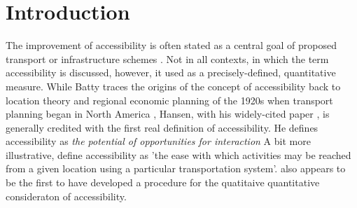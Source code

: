 \section{Introduction}
The improvement of accessibility is often stated as a central goal of proposed transport or infrastructure 
schemes \citep{GeursEtAl2012AccessibilityTransportIntroduction}. Not in all contexts, in which the term 
accessibility is discussed, however, it used as a precisely-defined, quantitative measure. While Batty 
\citep{Batty2009AccessibilityUnifiedTheory} traces the origins of the concept of accessibility back to 
location theory and regional economic planning of the 1920s when transport planning began in North America
\citep{GeursEtAl2012AccessibilityTransportIntroduction}, 
Hansen, with his widely-cited paper \citep{Hansen1959HowAccessibilityShapesLandUse}, is generally credited with the first real 
definition of accessibility. He defines accessibility as \textit{the potential of opportunities for interaction} 
A bit more illustrative, \citet{MorrisEtAl1978AccessibilityIndicators} define accessibility as 'the ease with 
which activities may be reached from a given location using a particular transportation system'.
\citet{Hansen1959HowAccessibilityShapesLandUse} also appears to be the first to have developed a procedure for the quatitaive quantitative 
consideraton of accessibility.
%
%

